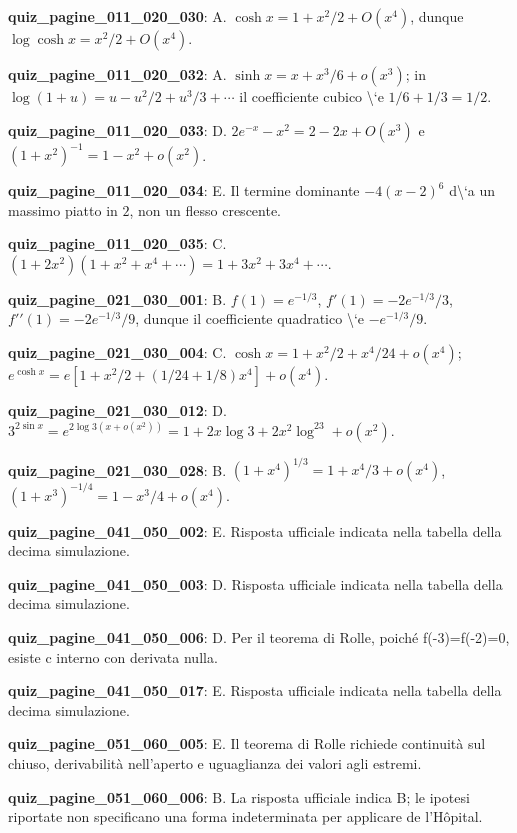 \documentclass[11pt,a4paper]{article}
\newcounter{quiz}
\begin{document}
\noindent\textbf{quiz\_pagine\_011\_020\_030}: A. $\cosh x=1+x^2/2+O(x^4)$, dunque $\log\cosh x=x^2/2+O(x^4)$.\par\medskip
\noindent\textbf{quiz\_pagine\_011\_020\_032}: A. $\sinh x=x+x^3/6+o(x^3)$; in $\log(1+u)=u-u^2/2+u^3/3+\cdots$ il coefficiente cubico \textbackslash{}`e $1/6+1/3=1/2$.\par\medskip
\noindent\textbf{quiz\_pagine\_011\_020\_033}: D. $2e^{-x}-x^2=2-2x+O(x^3)$ e $(1+x^2)^{-1}=1-x^2+o(x^2)$.\par\medskip
\noindent\textbf{quiz\_pagine\_011\_020\_034}: E. Il termine dominante $-4(x-2)^6$ d\textbackslash{}`a un massimo piatto in $2$, non un flesso crescente.\par\medskip
\noindent\textbf{quiz\_pagine\_011\_020\_035}: C. $(1+2x^2)(1+x^2+x^4+\cdots)=1+3x^2+3x^4+\cdots$.\par\medskip
\noindent\textbf{quiz\_pagine\_021\_030\_001}: B. $f(1)=e^{-1/3}$, $f\prime(1)=-2e^{-1/3}/3$, $f\prime\prime(1)=-2e^{-1/3}/9$, dunque il coefficiente quadratico \textbackslash{}`e $-e^{-1/3}/9$.\par\medskip
\noindent\textbf{quiz\_pagine\_021\_030\_004}: C. $\cosh x=1+x^2/2+x^4/24+o(x^4)$; $e^{\cosh x}=e[1+x^2/2+(1/24+1/8)x^4]+o(x^4)$.\par\medskip
\noindent\textbf{quiz\_pagine\_021\_030\_012}: D. $3^{2\sin x}=e^{2\log3(x+o(x^2))}=1+2x\log3+2x^2\log^23+o(x^2)$.\par\medskip
\noindent\textbf{quiz\_pagine\_021\_030\_028}: B. $(1+x^4)^{1/3}=1+x^4/3+o(x^4)$, $(1+x^3)^{-1/4}=1-x^3/4+o(x^4)$.\par\medskip
\noindent\textbf{quiz\_pagine\_041\_050\_002}: E. Risposta ufficiale indicata nella tabella della decima simulazione.\par\medskip
\noindent\textbf{quiz\_pagine\_041\_050\_003}: D. Risposta ufficiale indicata nella tabella della decima simulazione.\par\medskip
\noindent\textbf{quiz\_pagine\_041\_050\_006}: D. Per il teorema di Rolle, poiché f(-3)=f(-2)=0, esiste c interno con derivata nulla.\par\medskip
\noindent\textbf{quiz\_pagine\_041\_050\_017}: E. Risposta ufficiale indicata nella tabella della decima simulazione.\par\medskip
\noindent\textbf{quiz\_pagine\_051\_060\_005}: E. Il teorema di Rolle richiede continuità sul chiuso, derivabilità nell'aperto e uguaglianza dei valori agli estremi.\par\medskip
\noindent\textbf{quiz\_pagine\_051\_060\_006}: B. La risposta ufficiale indica B; le ipotesi riportate non specificano una forma indeterminata per applicare de l'Hôpital.\par\medskip
\end{document}

